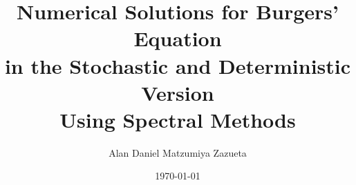\documentclass{tesismatpdf}
\date{\today}
\title{Numerical Solutions for Burgers' Equation \\ in the Stochastic and Deterministic Version\\ Using Spectral Methods}
\author{Alan Daniel Matzumiya Zazueta}
\begin{document}
\frontmatter
\maketitle
\cleardoublepage








\tableofcontents
\mainmatter

\thispagestyle{myheadings}







\begin{appendices}
	
\end{appendices}

%

%

\backmatter



\end{document}
